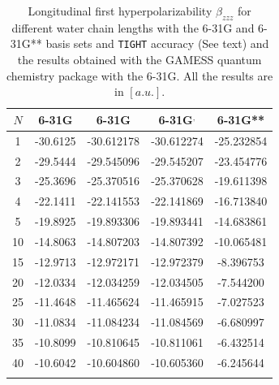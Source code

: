 \documentclass[prl,aps,twocolumn,showpacs,twocolumngrid,superbib]{revtex4}
\begin{document}
\begin{table}
  \centering
  \caption{\protect
    Longitudinal first hyperpolarizability $\beta_{zzz}$
    for different water chain lengths with the 6-31G and 6-31G** basis sets
    and {\tt TIGHT} accuracy (See text) and the results obtained with
    the GAMESS quantum chemistry package \cite{gamess} with the 6-31G. 
    All the results are in $[a.u.]$.
  }\label{tab:Beta_1D_Values}
  \begin{tabular}{ccccc}
    \toprule
    $N$ &\multicolumn{1}{c}{6-31G\footnotemark[1]}
    &\multicolumn{1}{c}{6-31G\footnotemark[2]}
    &\multicolumn{1}{c}{6-31G\footnotemark[2]$^,$\footnotemark[3]}
    &\multicolumn{1}{c}{6-31G**}\footnotemark[2] \\
    \hline
     1 & -30.6125 & -30.612178 & -30.612274 & -25.232854 \\
     2 & -29.5444 & -29.545096 & -29.545207 & -23.454776 \\
     3 & -25.3696 & -25.370516 & -25.370628 & -19.611398 \\
     4 & -22.1411 & -22.141553 & -22.141869 & -16.713840 \\
     5 & -19.8925 & -19.893306 & -19.893441 & -14.683861 \\
    10 & -14.8063 & -14.807203 & -14.807392 & -10.065481 \\
    15 & -12.9713 & -12.972171 & -12.972379 &  -8.396753 \\
    20 & -12.0334 & -12.034259 & -12.034505 &  -7.544200 \\
    25 & -11.4648 & -11.465624 & -11.465915 &  -7.027523 \\
    30 & -11.0834 & -11.084234 & -11.084569 &  -6.680997 \\
    35 & -10.8099 & -10.810645 & -10.811061 &  -6.432514 \\
    40 & -10.6042 & -10.604860 & -10.605360 &  -6.245644 \\
    \botrule
  \end{tabular}
\end{table}
\end{document}
